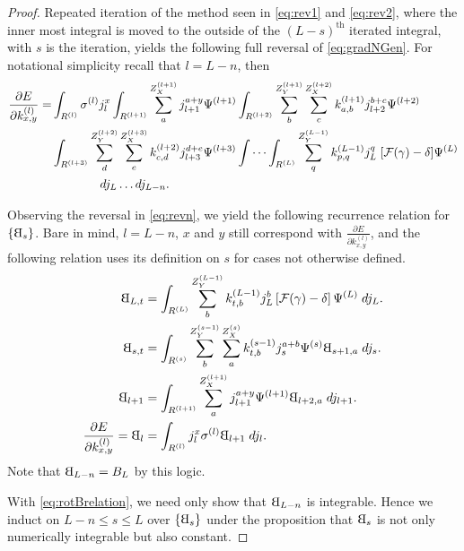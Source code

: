 \documentclass[titlepage, twoside]{article}
\numberwithin{equation}{subsection}
\numberwithin{theorem}{subsection}
\newcommand{\rotB}{\scalebox{-1}[1]{B}}
\begin{document}
\begin{proof}
  Repeated iteration of the method seen in \eqref{eq:rev1} and \eqref{eq:rev2}, where the inner most integral is moved to the outside of the $(L-s)^\mathrm{th}$ iterated integral, with $s$ is the iteration, yields the following full reversal of \eqref{eq:gradNGen}. For notational simplicity recall that $l = L-n$, then
 \begin{equation}\label{eq:revn}
  \begin{aligned}
    \frac{\partial E}{\partial k_{x,y}^{(l)}} =&
      \int_{R^{(l)}}  \sigma^{(l)}  j^{x}_{l}
      \int_{R^{(l+1)}} \sum_a^{Z^{(l+1)}_X} j_{l+1}^{a+y} \Psi^{(l+1)}
      \int_{R^{(l+2)}} \sum_b^{Z_Y^{(l+1)}} \sum_c^{Z_X^{(l+2)}}
         k^{(l+1)}_{a,b} j^{b+c}_{l+2} \Psi^{(l+2)} \\&
      \int_{R^{(l+3)}} \sum_d^{Z_Y^{(l+2)}} \sum_e^{Z_X^{(l+3)}}
         k^{(l+2)}_{c,d} j^{d+e}_{l+3} \Psi^{(l+3)} 
      \idotsint_{R^{(L)}} \sum_q^{Z^{(L-1)}_Y} k^{(L-1)}_{p,q} j_L^q 
       \; [\mathcal{F}(\gamma)-\delta] \Psi^{(L)} \\ &
      \qquad \qquad dj_{L}\dots dj_{L-n}.
  \end{aligned}
  \end{equation}

  Observing the reversal in \eqref{eq:revn}, we yield the following recurrence relation for $\{\rotB_s\}$. Bare in mind, $l= L-n$, $x$ and $y$ still correspond with $\frac{\partial E}{\partial k^{(l)}_{x,y}}$, and the following relation uses its definition on $s$ for cases not otherwise defined.
  \begin{equation} \label{eq:rotBrelation}
  \begin{aligned}
    \rotB_{L,t} &= \int_{R^{(L)}}  \sum_b^{Z^{(L-1)}_Y} k^{(L-1)}_{t,b} j_L^b 
      \left[\mathcal{F}(\gamma) - \delta\right] \Psi^{(L)}\;dj_L. \\
    \rotB_{s,t} &= \int_{R^{(s)}}\sum_b^{Z^{(s-1)}_Y} \sum_a^{Z^{(s)}_X} 
      k^{(s-1)}_{t,b} j_s^{a+b} \Psi^{(s)} \rotB_{s+1,a}\; dj_s. \\
    \rotB_{l+1} &= \int_{R^{(l+1)}} \sum_a^{Z^{(l+1)}_X}
      j^{a+y}_{l+1} \Psi^{(l+1)} \rotB_{l+2, a}\; dj_{l+1}. \\
     \frac{\partial E}{\partial k^{(l)}_{x,y}} = \rotB_{l} &= \int_{R^{(l)}}
      j_{l}^x \sigma^{(l)} \rotB_{l+1}\; dj_l.
  \end{aligned}
  \end{equation}
  Note that $\rotB_{L-n} = B_L$ by this logic.

  With \eqref{eq:rotBrelation}, we need only show that $\rotB_{L-n}$ is integrable. Hence we induct on $L-n \leq s \leq L$ over $\{\rotB_s\}$ under the proposition that $\rotB_s$ is not only numerically integrable but also constant. 


\end{proof}
\end{document}
